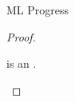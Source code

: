 \begin{theorem}{ML Progress}
\begin{proof}
\begin{case}{\psfappm}
\end{case}


\newcommand{\psconsem}{\expcons{\first{\varexpm}}{\second{\varexpm}}\xspace}

\begin{case}{\psconsem}

\pshypby
{\first{\varexpm}}
{\third{\varexpm}}
\pssub
{\first{\varexpm}}
{\third{\varexpm}}
{\psconsem}
{\expcons{\third{\varexpm}}{\second{\varexpm}}}
\pserr
{\first{\varexpm}}
{\psconsem}
\pssuband
{\second{\varexpm}}
{\third{\varexpm}}
{\first{\varexpm}}
{\psconsem}
{\expcons{\third{\varexpm}}{\second{\varexpm}}}
\pserrand
{\second{\varexpm}}
{\first{\varexpm}}
{\psconsem}
\psvaliftwo
{\first{\varexpm}}
{\second{\varexpm}}
{\psconsem is an \prouv.}

\end{case}

\end{proof}

\end{theorem}
